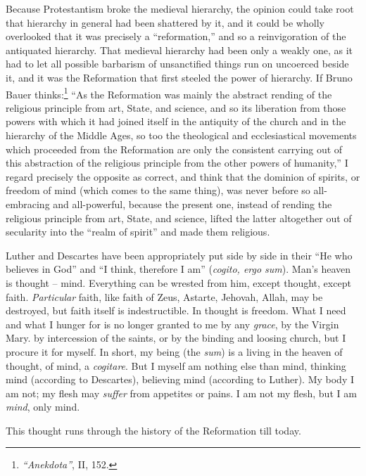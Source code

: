 Because Protestantism broke the medieval hierarchy, the opinion could take 
root that hierarchy in general had been shattered by it, and it could be 
wholly overlooked that it was precisely a ``reformation,'' and so a 
reinvigoration of the antiquated hierarchy. That medieval hierarchy had been 
only a weakly one, as it had to let all possible barbarism of unsanctified 
things run on uncoerced beside it, and it was the Reformation that first 
steeled the power of hierarchy. If Bruno Bauer 
thinks:\footnote{\textit{``Anekdota''}, II, 152.} ``As the Reformation was 
mainly the abstract rending of the religious principle from art, State, and 
science, and so its liberation from those powers with which it had joined 
itself in the antiquity of the church and in the hierarchy of the Middle Ages, 
so too the theological and ecclesiastical movements which proceeded from the 
Reformation are only the consistent carrying out of this abstraction of the 
religious principle from the other powers of humanity,'' I regard precisely 
the opposite as correct, and think that the dominion of spirits, or freedom of 
mind (which comes to the same thing), was never before so all-embracing and 
all-powerful, because the present one, instead of rending the religious 
principle from art, State, and science, lifted the latter altogether out of 
secularity into the ``realm of spirit'' and made them religious.

Luther and Descartes have been appropriately put side by side in their ``He 
who believes in God'' and ``I think, therefore I am'' (\textit{cogito, ergo 
sum}). Man's heaven is thought -- mind. Everything can be wrested from him, 
except thought, except faith. \textit{Particular} faith, like faith of Zeus, 
Astarte, Jehovah, Allah, may be destroyed, but faith itself is indestructible. 
In thought is freedom. What I need and what I hunger for is no longer granted 
to me by any \textit{grace}, by the Virgin Mary. by intercession of the 
saints, or by the binding and loosing church, but I procure it for myself. In 
short, my being (the \textit{sum}) is a living in the heaven of thought, of 
mind, a \textit{cogitare}. But I myself am nothing else than mind, thinking 
mind (according to Descartes), believing mind (according to Luther). My body I 
am not; my flesh may \textit{suffer} from appetites or pains. I am not my 
flesh, but I am \textit{mind}, only mind.

This thought runs through the history of the Reformation till today.

